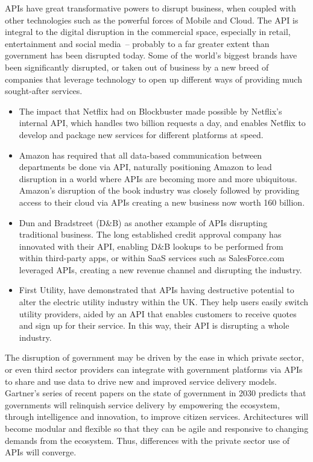 APIs have great transformative powers to disrupt business, when coupled
with other technologies such as the powerful forces of Mobile and Cloud.
The API is integral to the digital disruption in the commercial space,
especially in retail, entertainment and social media~\citep{api_economy}– probably
to a far greater extent than government has been disrupted today. Some
of the world’s biggest brands have been significantly disrupted, or taken
out of business by a new breed of companies that leverage technology to
open up different ways of providing much sought-after services.
\begin{itemize}
	\item The impact that Netflix had on Blockbuster made possible by
	Netflix’s internal API, which handles two billion requests a day,
	and enables Netflix to develop and package new services for different
	platforms at speed.
	
	\item Amazon has required that all data-based communication between
	departments be done via API, naturally positioning Amazon to lead
	disruption in a world where APIs are becoming more and more ubiquitous.
	Amazon’s disruption of the book industry was closely followed by providing
	access to their cloud via APIs creating a new business now worth 160 billion.
	
	\item Dun and Bradstreet (D\&B) as another example of APIs disrupting
	traditional business. The long established credit approval company has
	innovated with their API, enabling D\&B lookups to be performed from
	within third-party apps, or within SaaS services such as SalesForce.com
	leveraged APIs, creating a new revenue channel and disrupting the industry.
	
	\item First Utility, have demonstrated that APIs having destructive
	potential to alter the electric utility	industry within the UK. They
	help users easily switch utility providers, aided by an API that enables
	customers to receive quotes and sign up for their service. In this way,
	their API is disrupting a whole industry.
\end{itemize}

The disruption of government may be driven by the ease in which private sector,
or even third sector providers can integrate with government platforms via APIs
to share and use data to drive new and improved service delivery models.
Gartner’s series of recent papers on the state of government in 2030 predicts
that governments will relinquish service delivery by empowering the ecosystem,
through intelligence and innovation, to improve citizen services. Architectures
will become modular and flexible so that they can be agile and responsive to
changing demands from the ecosystem. Thus, differences with the private sector
use of APIs will converge.

